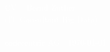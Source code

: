 \newcommand{\cccvname}{Bernd Zuther}
\newcommand{\cccvjobtitle}{IT Consultant Big Data}

\NoBgThispage
\AddToShipoutPicture*{\BackgroundPic}
\vspace*{18.5cm}
\noindent
\textcolor{white}{
{\Huge CV -- \cccvname}\\[8pt]
{\huge (\cccvjobtitle)}\\
\\[8pt]
{\Large codecentric AG | \today}
}

